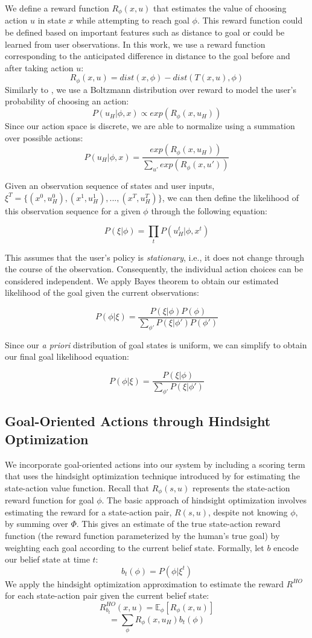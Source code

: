 \documentclass[conference]{IEEEtran}
\begin{document}
We define a reward function $R_\phi (x, u)$ that estimates the value of choosing action $u$ in state $x$ while attempting to reach goal $\phi$. This reward function could be defined based on important features such as distance to goal or could be learned from user observations. In this work, we use a reward function corresponding to the anticipated difference in distance to the goal before and after taking action $u$:
\[
R_\phi (x, u) = dist(x, \phi) - dist(T(x, u), \phi)
\]
Similarly to \citet{ramachandran2007bayesian}, we use a Boltzmann distribution over reward to model the user's probability of choosing an action:
\[
P(u_H|\phi, x) \propto exp(R_\phi (x, u_H))
\]
Since our action space is discrete, we are able to normalize using a summation over possible actions:
\[
P(u_H|\phi, x) = \frac{exp(R_\phi (x, u_H))}{\sum_{u'} exp(R_\phi (x, u'))}
\]

Given an observation sequence of states and user inputs, $\xi^T = \{(x^0, u_H^0), (x^1, u_H^1), ..., (x^T, u_H^T)\}$, we can then define the likelihood of this observation sequence for a given $\phi$ through the following equation:

\[
P(\xi|\phi) = \prod_tP(u_H^t|\phi, x^t)
\]

This assumes that the user's policy is \textit{stationary}, i.e., it does not change through the course of the observation. Consequently, the individual action choices can be considered independent. We apply Bayes theorem to obtain our estimated likelihood of the goal given the current observations:

\[
P(\phi|\xi) = \frac{P(\xi|\phi)P(\phi)}{\sum_{\phi'}P(\xi|\phi')P(\phi')}
\]

Since our \textit{a priori} distribution of goal states is uniform, we can simplify to obtain our final goal likelihood equation:

\[
P(\phi|\xi) = \frac{P(\xi|\phi)}{\sum_{\phi'}P(\xi|\phi')}
\]

\subsection{Goal-Oriented Actions through Hindsight Optimization}

We incorporate goal-oriented actions into our system by including a scoring term that uses the hindsight optimization technique introduced by \citet{javdani2015shared} for estimating the state-action value function. Recall that $R_\phi(s, u)$ represents the state-action reward function for goal $\phi$. The basic approach of hindsight optimization involves estimating the reward for a state-action pair, $R(s, u)$, despite not knowing $\phi$, by summing over $\Phi$. This gives an estimate of the true state-action reward function (the reward function parameterized by the human's true goal) by weighting each goal according to the current belief state. Formally, let $b$ encode our belief state at time $t$:
\[
b_t(\phi) = P(\phi|\xi^t)
\]
We apply the hindsight optimization approximation to estimate the reward $R^{HO}$ for each state-action pair given the current belief state:
\[
R^{HO}_{b_t}(x,u) = \mathbb{E}_\phi[R_\phi (x, u)]
\]
\[
=\sum_\phi R_\phi (x, u_H)b_t(\phi)
\]
\end{document}
